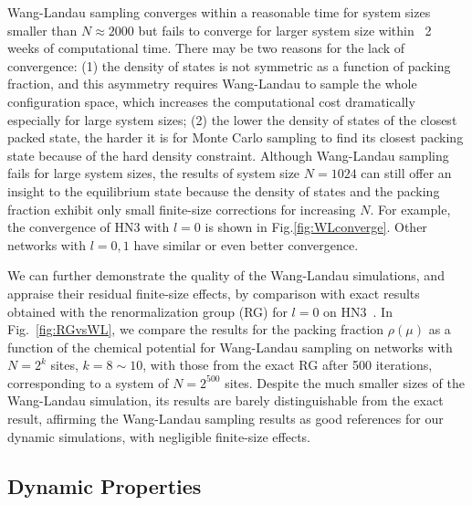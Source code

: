 Wang-Landau sampling converges within a reasonable time for system
sizes smaller than $N\approx2000$ but fails to converge for larger
system size within ~2 weeks of computational time. 
There may be two reasons for the lack of convergence:
(1) the density of states is not symmetric as a function of packing
fraction, and this asymmetry requires Wang-Landau to sample the whole
configuration space, which increases the computational cost dramatically
especially for large system sizes; (2) the lower the density of states
of the closest packed state, the harder it is for Monte Carlo sampling
to find its closest packing state because of the hard density constraint.
Although Wang-Landau sampling fails for large system sizes, the results
of system size $N=1024$ can still offer an insight to the equilibrium
state because the density of states and the packing fraction exhibit only small 
finite-size corrections for increasing $N$. For example, the convergence of HN3
with $l=0$ is shown in Fig.\ref{fig:WLconverge}. Other networks
with $l=0,1$ have similar or even better convergence.

We can further demonstrate the quality of the Wang-Landau simulations,
and appraise their residual finite-size effects, by comparison with
exact results obtained with the renormalization group (RG) for $l=0$
on HN3~\cite{BoHa11}. In Fig.~\ref{fig:RGvsWL}, we compare the results
for the packing fraction $\rho(\mu)$ as a function of the chemical
potential for Wang-Landau sampling on networks with $N=2^{k}$ sites, $k=8\sim10$,
with those from the exact RG after 500 iterations, corresponding
to a system of $N=2^{500}$ sites. Despite the much smaller sizes
of the Wang-Landau simulation, its results are barely distinguishable
from the exact result, affirming the Wang-Landau sampling results
as good references for our dynamic simulations, with negligible finite-size
effects.


\subsection{Dynamic Properties}


